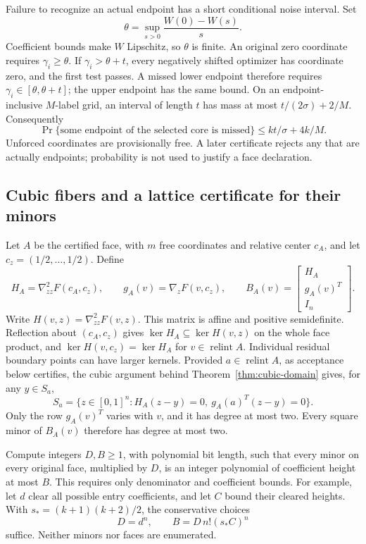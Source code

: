 Failure to recognize an actual endpoint has a short conditional
noise interval. Set
\[
 \theta=\sup_{s>0}\frac{W(0)-W(s)}s.
\]
Coefficient bounds make $W$ Lipschitz, so $\theta$ is finite. An
original zero coordinate requires $\gamma_i\ge\theta$. If
$\gamma_i>\theta+t$, every negatively shifted optimizer has coordinate
zero, and the first test passes. A missed lower endpoint therefore
requires $\gamma_i\in[\theta,\theta+t]$; the upper endpoint has the
same bound. On an endpoint-inclusive $M$-label grid, an interval of
length $t$ has mass at most $t/(2\sigma)+2/M$. Consequently
\begin{equation}
 \Pr\{\text{some endpoint of the selected core is missed}\}
 \le kt/\sigma+4k/M.
 \label{eq:recourse-face-tail}
\end{equation}
Unforced coordinates are provisionally free. A later certificate rejects
any that are actually endpoints; probability is not used to justify a
face declaration.

\subsection{Cubic fibers and a lattice certificate for their minors}

Let $A$ be the certified face, with $m$ free coordinates and relative
center $c_A$, and let $c_z=(1/2,\ldots,1/2)$. Define
\[
 H_A=\nabla^2_{zz}F(c_A,c_z),\qquad
 g_A(v)=\nabla_zF(v,c_z),\qquad
 B_A(v)=\begin{bmatrix}H_A\\g_A(v)^T\\I_n\end{bmatrix}.
\]
Write $H(v,z)=\nabla^2_{zz}F(v,z)$. This matrix is affine and positive
semidefinite. Reflection about $(c_A,c_z)$ gives
$\ker H_A\subseteq\ker H(v,z)$ on the whole face product, and
$\ker H(v,c_z)=\ker H_A$ for $v\in\operatorname{relint}A$.
Individual residual boundary points can have larger kernels.
Provided $a\in\operatorname{relint}A$, as acceptance below certifies,
the cubic argument behind Theorem~\ref{thm:cubic-domain} gives, for
any $y\in S_a$,
\begin{equation}
 S_a=\{z\in[0,1]^n:H_A(z-y)=0,\ g_A(a)^T(z-y)=0\}.
 \label{eq:recourse-fiber}
\end{equation}
Only the row $g_A(v)^T$ varies with $v$, and it has degree at most two.
Every square minor of $B_A(v)$ therefore has degree at most two.

Compute integers $D,B\ge1$, with polynomial bit length, such that
every minor on every original face, multiplied by $D$, is an integer
polynomial of coefficient height at most $B$. This requires only
denominator and coefficient bounds. For example, let $d$ clear all
possible entry coefficients, and let $C$ bound their cleared heights.
With $s_*=(k+1)(k+2)/2$, the conservative choices
\[
 D=d^n,\qquad B=D\,n!(s_*C)^n
\]
suffice. Neither minors nor faces are enumerated.

